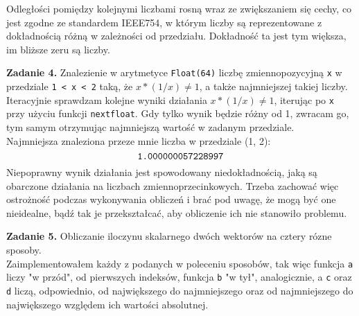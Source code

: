\documentclass[15pt, a4paper]{article}
\begin{document}
\vspace{0.5cm}

Odległości pomiędzy kolejnymi liczbami rosną wraz ze zwiększaniem się cechy, co jest zgodne ze standardem IEEE754, w którym liczby są reprezentowane z dokładnością różną w zależności od przedziału. Dokładność ta jest tym większa, im bliższe zeru są liczby.

\vspace{0.5cm}

\noindent\hrulefill


\vspace{0.5cm}

\noindent\textbf{Zadanie 4.} Znalezienie w arytmetyce \verb|Float(64)| liczbę zmiennopozycyjną \verb|x| w przedziale \verb|1 < x < 2| taką, że $x * (1/x) \neq 1$, a także najmniejszej takiej liczby.\\
Iteracyjnie sprawdzam kolejne wyniki działania $x * (1/x) \neq 1$, iterując po \verb|x| przy użyciu funkcji \verb|nextfloat|. Gdy tylko wynik będzie różny od 1, zwracam go, tym samym otrzymując najmniejszą wartość w zadanym przedziale.\\
Najmniejsza znaleziona przeze mnie liczba w przedziale (1, 2): \[\verb|1.000000057228997|\]
Niepoprawny wynik działania jest spowodowany niedokładnością, jaką są obarczone działania na liczbach zmiennoprzecinkowych. Trzeba zachować więc ostrożność podczas wykonywania obliczeń i brać pod uwagę, że mogą być one nieidealne, bądź tak je przekształcać, aby obliczenie ich nie stanowiło problemu.

\vspace{0.5cm}

\noindent\hrulefill


\vspace{0.5cm}

\noindent\textbf{Zadanie 5.} Obliczanie iloczynu skalarnego dwóch wektorów na cztery rózne sposoby.\\
Zaimplementowałem każdy z podanych w poleceniu sposobów, tak więc funkcja \verb|a| liczy "w przód", od pierwszych indeksów, funkcja \verb|b| "w tył", analogicznie, a \verb|c| oraz \verb|d| liczą, odpowiednio, od największego do najmniejszego oraz od najmniejszego do największego względem ich wartości absolutnej.
\end{document}
